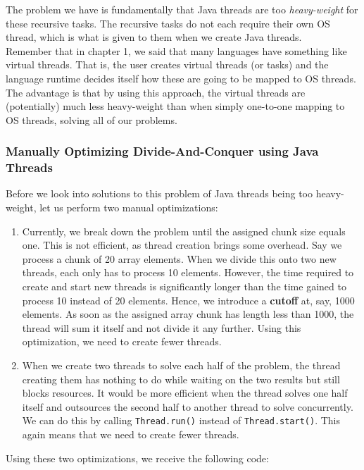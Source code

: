\documentclass[main.tex]{subfiles}
\begin{document}
\noindent The problem we have is fundamentally that Java threads are too \textit{heavy-weight} for these recursive tasks. The recursive tasks do not each require their own OS thread, which is what is given to them when we create Java threads.\\
Remember that in chapter 1, we said that many languages have something like virtual threads. That is, the user creates virtual threads (or tasks) and the language runtime decides itself how these are going to be mapped to OS threads. The advantage is that by using this approach, the virtual threads are (potentially) much less heavy-weight than when simply one-to-one mapping to OS threads, solving all of our problems.

\subsubsection{Manually Optimizing Divide-And-Conquer using Java Threads}
Before we look into solutions to this problem of Java threads being too heavy-weight, let us perform two manual optimizations:

\begin{enumerate}
  \item Currently, we break down the problem until the assigned chunk size equals one. This is not efficient, as thread creation brings some overhead. Say we process a chunk of 20 array elements. When we divide this onto two new threads, each only has to process 10 elements. However, the time required to create and start new threads is significantly longer than the time gained to process 10 instead of 20 elements. Hence, we introduce a \textbf{cutoff} at, say, 1000 elements. As soon as the assigned array chunk has length less than 1000, the thread will sum it itself and not divide it any further. Using this optimization, we need to create fewer threads.
  \item When we create two threads to solve each half of the problem, the thread creating them has nothing to do while waiting on the two results but still blocks resources. It would be more efficient when the thread solves one half itself and outsources the second half to another thread to solve concurrently. We can do this by calling \texttt{Thread.run()} instead of \texttt{Thread.start()}. This again means that we need to create fewer threads.
\end{enumerate}

\noindent Using these two optimizations, we receive the following code:
\end{document}
